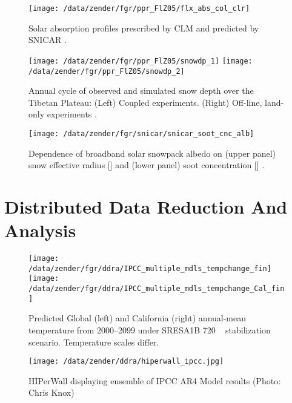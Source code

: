\documentclass[12pt]{article}
\begin{document}
\Large
\begin{figure*}
\texttt{[image: /data/zender/fgr/ppr\_FlZ05/flx\_abs\_col\_clr]}%
\caption{
Solar absorption profiles prescribed by CLM and predicted by SNICAR \cite[][]{FlZ05}.
\label{fgr:rfl_snw_snicar}}
\end{figure*}
\clearpage

\Large
\begin{figure}
\texttt{[image: /data/zender/fgr/ppr\_FlZ05/snowdp\_1]}%
\texttt{[image: /data/zender/fgr/ppr\_FlZ05/snowdp\_2]}
\caption{Annual cycle of observed and simulated snow depth over the
  Tibetan Plateau: (Left) Coupled experiments. (Right) Off-line,
  land-only experiments \cite[][]{FlZ05}.}
\label{fgr:snowdp}
\end{figure}
\clearpage

\Large
\begin{figure}
\centering
\texttt{[image: /data/zender/fgr/snicar/snicar\_soot\_cnc\_alb]}
\caption{Dependence of broadband solar snowpack albedo on (upper panel)
  snow effective radius [\um] and (lower panel) soot concentration
  [\ngxg] \cite[][]{FlZ05,FlZ06}.}
\label{fgr:rfl_snw_soot}
\end{figure}
\clearpage

\section[Distributed Data Reduction And Analysis]{Distributed Data Reduction And Analysis}
\Large
\clearpage

\Large
\begin{figure}
\texttt{[image: /data/zender/fgr/ddra/IPCC\_multiple\_mdls\_tempchange\_fin]}%
\texttt{[image: /data/zender/fgr/ddra/IPCC\_multiple\_mdls\_tempchange\_Cal\_fin]}%
\caption{
Predicted Global (left) and California (right) annual-mean temperature
from 2000--2099 under SRESA1B 720\,\ppm\ \COd\ stabilization scenario. 
Temperature scales differ.
\label{fgr:ccsm_tm_tas}}
\end{figure}
\clearpage

\Large
\begin{figure}
\texttt{[image: /data/zender/ddra/hiperwall\_ipcc.jpg]}%
\caption{
HIPerWall displaying ensemble of IPCC AR4 Model results (Photo: Chris Knox)
\label{fgr:hiperwall_ipcc}}
\end{figure}
\clearpage
\end{document}
